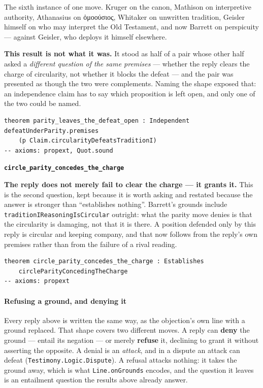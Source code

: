 \documentclass[11pt]{article}
\begin{document}
The sixth instance of one move. Kruger on the canon, Mathison on interpretive authority, Athanasius on ὁμοούσιος, Whitaker on unwritten tradition, Geisler himself on who may interpret the Old Testament, and now Barrett on perspicuity — against Geisler, who deploys it himself elsewhere.

\textbf{This result is not what it was.} It stood as half of a pair whose other half asked a \emph{different question of the same premises} — whether the reply clears the charge of circularity, not whether it blocks the defeat — and the pair was presented as though the two were complements. Naming the shape exposed that: an independence claim has to say which proposition is left open, and only one of the two could be named.

{\small\begin{verbatim}
theorem parity_leaves_the_defeat_open : Independent defeatUnderParity.premises
    (p Claim.circularityDefeatsTraditionI)
-- axioms: propext, Quot.sound
\end{verbatim}}
\par\medskip\noindent\textbf{\texttt{circle\_\allowbreak{}parity\_\allowbreak{}concedes\_\allowbreak{}the\_\allowbreak{}charge}}\par\nobreak\noindent
\textbf{The reply does not merely fail to clear the charge — it grants it.} This is the second question, kept because it is worth asking and restated because the answer is stronger than “establishes nothing”. Barrett’s grounds include \texttt{tradition\allowbreak{}IReasoning\allowbreak{}Is\allowbreak{}Circular} outright: what the parity move denies is that the circularity is damaging, not that it is there. A position defended only by this reply is circular and keeping company, and that now follows from the reply’s own premises rather than from the failure of a rival reading.

{\small\begin{verbatim}
theorem circle_parity_concedes_the_charge : Establishes
    circleParityConcedingTheCharge
-- axioms: propext
\end{verbatim}}
\paragraph*{Refusing a ground, and denying it}
\leavevmode\par\nobreak
Every reply above is written the same way, as the objection’s own line with a ground replaced. That shape covers two different moves. A reply can \textbf{deny} the ground — entail its negation — or merely \textbf{refuse} it, declining to grant it without asserting the opposite. A denial is an \emph{attack}, and in a dispute an attack can defeat (\texttt{Testimony.Logic.Dispute}). A refusal attacks nothing: it takes the ground away, which is what \texttt{Line.on\allowbreak{}Grounds} encodes, and the question it leaves is an entailment question the results above already answer.
\end{document}
